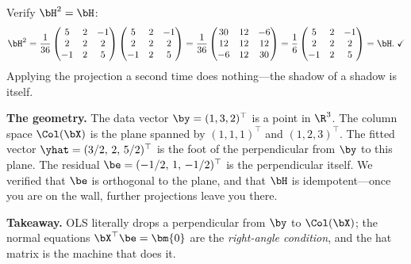 \begin{example}
\smallskip
Verify $\bH^2 = \bH$:
\[
\bH^2 = \frac{1}{36}
\begin{pmatrix} 5 & 2 & -1 \\ 2 & 2 & 2 \\ -1 & 2 & 5 \end{pmatrix}
\begin{pmatrix} 5 & 2 & -1 \\ 2 & 2 & 2 \\ -1 & 2 & 5 \end{pmatrix}
= \frac{1}{36}
\begin{pmatrix} 30 & 12 & -6 \\ 12 & 12 & 12 \\ -6 & 12 & 30 \end{pmatrix}
= \frac{1}{6}\begin{pmatrix} 5 & 2 & -1 \\ 2 & 2 & 2 \\ -1 & 2 & 5 \end{pmatrix}
= \bH.\;\checkmark
\]
Applying the projection a second time does nothing---the shadow of a shadow is itself.

\medskip\noindent\textbf{The geometry.}
The data vector $\by = (1, 3, 2)^\top$ is a point in $\R^3$.
The column space $\Col(\bX)$ is the plane spanned by $(1,1,1)^\top$ and $(1,2,3)^\top$.
The fitted vector $\yhat = (3/2,\, 2,\, 5/2)^\top$ is the foot of the perpendicular from $\by$ to this plane.
The residual $\be = (-1/2,\, 1,\, -1/2)^\top$ is the perpendicular itself.
We verified that $\be$ is orthogonal to the plane, and that $\bH$ is idempotent---once you are on the wall, further projections leave you there.

\medskip\noindent\textbf{Takeaway.}
OLS literally drops a perpendicular from $\by$ to $\Col(\bX)$;
the normal equations $\bX^\top\be=\bm{0}$ are the \emph{right-angle condition},
and the hat matrix is the machine that does it.
\end{example}


